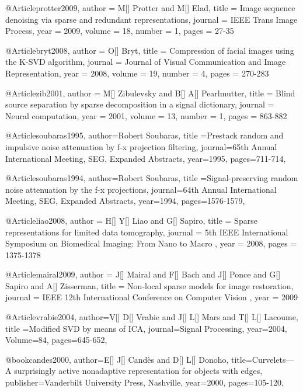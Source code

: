 @Article{protter2009,
  author = 	 {M[] Protter and M[] Elad},
  title = 	 {Image sequence denoising via sparse and redundant representations},
  journal = 	 {IEEE Trans Image Process},
  year = 	 2009,
  volume = 	 18,
  number = 	 1,
  pages = 	 {27-35}}

@Article{bryt2008,
  author = 	 {O[] Bryt},
  title = 	 {Compression of facial images using the {K}-{SVD} algorithm},
  journal = 	 {Journal of Visual Communication and Image Representation},
  year = 	 2008,
  volume = 	 19,
  number = 	 4,
  pages = 	 {270-283}}

@Article{zib2001,
  author = 	 {M[] Zibulevsky and B[] A[] Pearlmutter},
  title = 	 {Blind source separation by sparse decomposition in a signal dictionary},
  journal = 	 {Neural computation},
  year = 	 2001,
  volume = 	 13,
  number = 	 1,
  pages = 	 {863-882}}

@Article{soubaras1995,
  author={Robert Soubaras},
  title ={Prestack random and impulsive noise attenuation by f-x projection filtering},
  journal={65th Annual International Meeting, SEG, Expanded Abstracts},
  year=1995,
  pages={711-714},
}

@Article{soubaras1994,
  author={Robert Soubaras},
  title ={Signal-preserving random noise attenuation by the f-x projections},
  journal={64th Annual International Meeting, SEG, Expanded Abstracts},
  year=1994,
  pages={1576-1579},
}

@Article{liao2008,
  author = 	 {H[] Y[] Liao and G[] Sapiro},
  title = 	 {Sparse representations for limited data tomography},
  journal = 	 {5th IEEE International Symposium on Biomedical Imaging: From Nano to Macro },
  year = 	 2008,
  pages = 	 {1375-1378}}

@Article{mairal2009,
  author = 	 {J[] Mairal and F[] Bach and J[] Ponce and G[] Sapiro and A[] Zisserman},
  title = 	 {Non-local sparse models for image restoration},
  journal = 	 {IEEE 12th International Conference on Computer Vision  },
  year = 	 2009}


@Article{vrabie2004,
  author={V[] D[] Vrabie and J[] L[] Mars and T[] L[] Lacoume},
  title ={Modified SVD by means of ICA},
  journal={Signal Processing},
  year=2004,
  Volume=84,
  pages={645-652},
}

@book{candes2000,
  author={E[] J[] Cand\`{e}s and D[] L[] Donoho},
  title={Curvelets—A surprisingly active nonadaptive representation for objects with edges},
  publisher={Vanderbilt University Press, Nashville},
  year=2000,
    pages={105-120},
}



